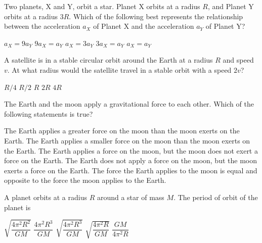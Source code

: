 \documentclass{../../../oss-ap12ibhl}
\begin{document}
\begin{questions}
  \question Two planets, X and Y, orbit a star. Planet X orbits at a radius
  $R$, and Planet Y orbits at a radius $3R$. Which of the following best
  represents the relationship between the acceleration $a_X$ of Planet X and the
  acceleration $a_Y$ of Planet Y?
  \begin{center}
  \end{center}
  \begin{choices}
    \choice $a_X = 9a_Y$
    \choice $9a_X = a_Y$
    \choice $a_X = 3a_Y$
    \choice $3a_X = a_Y$
    \choice $a_X = a_Y$
  \end{choices}
    
  \question A satellite is in a stable circular orbit around the Earth at a
  radius $R$ and speed $v$. At what radius would the satellite travel in a
  stable orbit with a speed $2v$?
  \begin{choices}
    \choice $R/4$
    \choice $R/2$
    \choice $R$
    \choice $2R$
    \choice $4R$
  \end{choices}
  
  \question The Earth and the moon apply a gravitational force to each other.
  Which of the following statements is true?
  \begin{choices}
    \choice The Earth applies a greater force on the moon than the moon exerts
    on the Earth.
    \choice The Earth applies a smaller force on the moon than the moon exerts
    on the Earth.
    \choice The Earth applies a force on the moon, but the moon does not exert a
    force on the Earth.
    \choice The Earth does not apply a force on the moon, but the moon exerts a
    force on the Earth.
    \choice The force the Earth applies to the moon is equal and opposite to the
    force the moon applies to the Earth.
  \end{choices}
  \vspace{.7in}

  \question A planet orbits at a radius $R$ around a star of mass $M$. The
  period of orbit of the planet is
  \begin{choices}
    \choice $\sqrt{\dfrac{4\pi^2R^2}{GM}}$
    \choice $\dfrac{4\pi^2R^3}{GM}$
    \choice $\sqrt{\dfrac{4\pi^2R^3}{GM}}$
    \choice $\sqrt{\dfrac{4\pi^2R}{GM}}$
    \choice $\dfrac{GM}{4\pi^2R}$
  \end{choices}


\end{questions}
\end{document}
